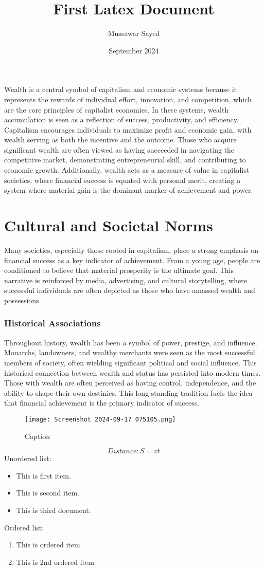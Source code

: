 \documentclass{article}
\title{First Latex Document}
\author{Mussawar Sayed}
\date{September 2024}
\begin{document}
Wealth is a central symbol of capitalism and economic systems because it represents the rewards of individual effort, innovation, and competition, which are the core principles of capitalist economies. In these systems, wealth accumulation is seen as a reflection of success, productivity, and efficiency. Capitalism encourages individuals to maximize profit and economic gain, with wealth serving as both the incentive and the outcome. Those who acquire significant wealth are often viewed as having succeeded in navigating the competitive market, demonstrating entrepreneurial skill, and contributing to economic growth. Additionally, wealth acts as a measure of value in capitalist societies, where financial success is equated with personal merit, creating a system where material gain is the dominant marker of achievement and power. 

\section{\textbf{Cultural and Societal Norms }}
Many societies, especially those rooted in capitalism, place a strong emphasis on financial success as a key indicator of achievement. From a young age, people are conditioned to believe that material prosperity is the ultimate goal. This narrative is reinforced by media, advertising, and cultural storytelling, where successful individuals are often depicted as those who have amassed wealth and possessions. 
\subsubsection{\textbf{Historical Associations} }
Throughout history, wealth has been a symbol of power, prestige, and influence. Monarchs, landowners, and wealthy merchants were seen as the most successful members of society, often wielding significant political and social influence. This historical connection between wealth and status has persisted into modern times. Those with wealth are often perceived as having control, independence, and the ability to shape their own destinies. This long-standing tradition fuels the idea that financial achievement is the primary indicator of success. 
\begin{figure}[h]
    \centering
    \texttt{[image: Screenshot 2024-09-17 075105.png]}
    \caption{Caption}
    \label{fig:1.1}
\end{figure}
\begin{equation}
    \label{Distance}
    Distance:
    S = vt
\end{equation}
Unordered list:
\begin{itemize}
    \item This is first item.
    \item This is second item.
    \item This is third document.
\end{itemize}
Ordered list:
\begin{enumerate}
    \item This is ordered item
    \item This is 2nd ordered item
\end{enumerate}
\end{document}
